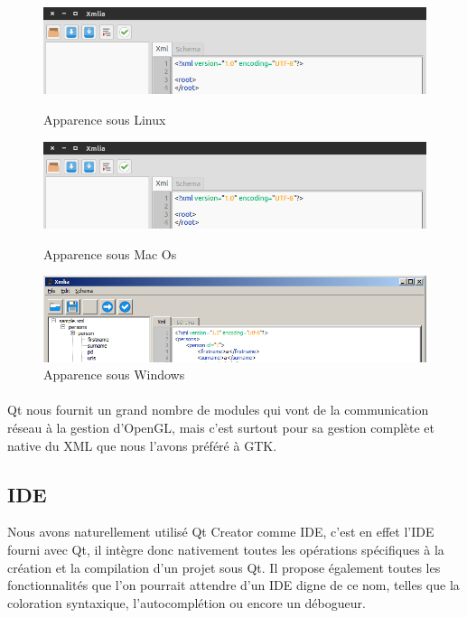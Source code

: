 \begin{figure}[h!]
\begin{minipage}[b]{\linewidth}
\centering \includegraphics[scale=0.5]{images/apparence_linux.png}
\caption{Apparence sous Linux}
\label{apparence_linux}
\end{minipage}
\begin{minipage}[b]{\linewidth}   
\centering \includegraphics[scale=0.5]{images/apparence_linux.png}
\caption{Apparence sous Mac Os}
\label{apparence_mac}
\end{minipage}
\begin{minipage}[b]{\linewidth}
\centering \includegraphics[scale=0.67]{images/apparence_windows.png}
\caption{Apparence sous Windows}
\label{apparence_windows}
\end{minipage}
\end{figure}

\paragraph{}
Qt nous fournit un grand nombre de modules qui vont de la communication réseau à la gestion d'OpenGL, mais c'est surtout pour sa gestion complète et native du XML que nous l'avons préféré à GTK.

\subsection{IDE}
Nous avons naturellement utilisé Qt Creator comme IDE, c'est en effet l'IDE fourni avec Qt, il intègre donc nativement toutes les opérations spécifiques à la création et la compilation d'un projet sous Qt. Il propose également toutes les fonctionnalités que l'on pourrait attendre d'un IDE digne de ce nom, telles que la coloration syntaxique, l'autocomplétion ou encore un débogueur.
